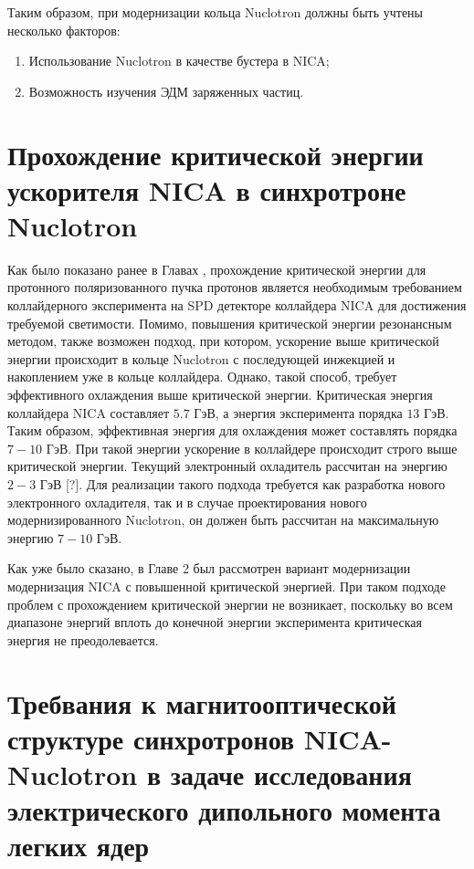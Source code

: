 Таким образом, при модернизации кольца Nuclotron должны быть учтены несколько факторов:

\begin{enumerate}
    \item Использование Nuclotron в качестве бустера в NICA;
    \item Возможность изучения ЭДМ заряженных частиц.
\end{enumerate}

	\section{Прохождение критической энергии ускорителя NICA в синхротроне Nuclotron}\label{sec:EDM/nuclotron}

\par Как было показано ранее в Главах , прохождение критической энергии для протонного поляризованного пучка протонов является необходимым требованием коллайдерного эксперимента на SPD детекторе коллайдера NICA для достижения требуемой светимости. Помимо, повышения критической энергии резонансным методом, также возможен подход, при котором, ускорение выше критической энергии происходит в кольце Nuclotron с последующей инжекцией и накоплением уже в кольце коллайдера. Однако, такой способ, требует эффективного охлаждения выше критической энергии. Критическая энергия коллайдера NICA составляет $5.7$ ГэВ, а энергия эксперимента порядка $13$ ГэВ. Таким образом, эффективная энергия для охлаждения может составлять порядка $7-10$ ГэВ. При такой энергии ускорение в коллайдере происходит строго выше критической энергии. Текущий электронный охладитель рассчитан на энергию $2-3$ ГэВ [?]. Для реализации такого подхода требуется как разработка нового электронного охладителя, так и в случае проектирования нового модернизированного Nuclotron, он должен быть рассчитан на максимальную энергию $7-10$ ГэВ.

\par Как уже было сказано, в Главе 2 был рассмотрен вариант модернизации модернизация NICA с повышенной критической энергией. При таком подходе проблем с прохождением критической энергии не возникает, поскольку во всем диапазоне энергий вплоть до конечной энергии эксперимента критическая энергия не преодолевается.

	\section{Требвания к магнитооптической структуре синхротронов NICA-Nuclotron в задаче исследования электрического дипольного момента легких ядер}\label{sec:EDM/requirements}

